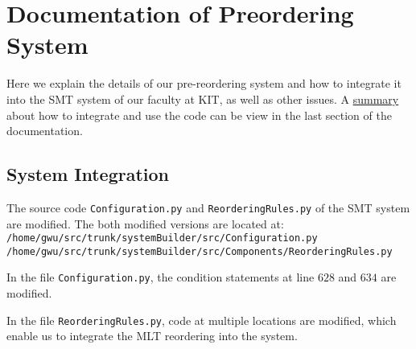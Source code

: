 

\appendix

{}	%
{}	%




%		
%		
%
%


\section{Documentation of Preordering System}
		\label{Documentation}

Here we explain the details of our pre-reordering system and how to integrate it into the SMT system of our faculty at KIT, as well as other issues. A \hyperref[summary]{summary} about how to integrate and use the code can be view in the last section of the documentation.

\subsection{System Integration}

The source code \verb|Configuration.py| and \verb|ReorderingRules.py| of the SMT system are modified. The both modified versions are located at:\\
\verb|/home/gwu/src/trunk/systemBuilder/src/Configuration.py|\\
\verb|/home/gwu/src/trunk/systemBuilder/src/Components/ReorderingRules.py|

In the file \verb|Configuration.py|, the condition statements at line $628$ and $634$ are modified.

In the file \verb|ReorderingRules.py|, code at multiple locations are modified, which enable us to integrate the MLT reordering into the system.


